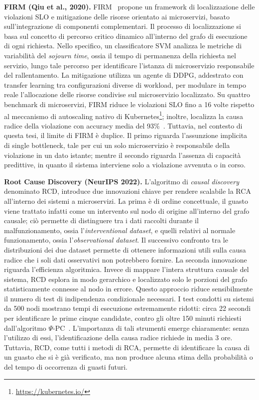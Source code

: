 \textbf{FIRM (Qiu et al., 2020).} FIRM~\cite{qiu2020firm} propone un framework di 
localizzazione delle violazioni \gls{SLO} e mitigazione delle risorse orientato ai 
microservizi, basato sull'integrazione di componenti complementari. 
Il processo di localizzazione si basa sul concetto di percorso critico dinamico all'interno 
del grafo di esecuzione di ogni richiesta. Nello specifico, un classificatore \gls{SVM} analizza le 
metriche di variabilità del \emph{sojourn time}, ossia il tempo di permanenza della richiesta nel servizio, 
lungo tale percorso per identificare l'istanza di microservizio responsabile del rallentamento. 
La mitigazione utilizza un agente di \gls{DDPG}, addestrato con transfer learning tra configurazioni 
diverse di workload, per modulare in tempo reale l'allocazione delle risorse condivise 
sul microservizio localizzato. Su quattro benchmark di microservizi, FIRM riduce le violazioni 
\gls{SLO} fino a 16 volte rispetto al meccanismo di autoscaling nativo di Kubernetes\footnote{\url{https://kubernetes.io/}}; 
inoltre, localizza la causa radice della violazione con accuracy media del 93\%~\cite{qiu2020firm}. 
Tuttavia, nel contesto di questa tesi, il limite di FIRM è duplice. Il primo riguarda 
l'assunzione implicita di single bottleneck, tale per cui un solo microservizio è 
responsabile della violazione in un dato istante; mentre il secondo riguarda l'assenza 
di capacità predittive, in quanto il sistema interviene solo a violazione avvenuta o in corso.

\textbf{Root Cause Discovery (NeurIPS 2022).} L'algoritmo di \emph{causal discovery}~\cite{ikram2022rcd} denominato \gls{RCD}, 
introduce due innovazioni chiave per rendere scalabile la \gls{RCA} all'interno dei sistemi a microservizi. 
La prima è di ordine concettuale, il guasto viene trattato infatti come un intervento sul nodo di origine 
all'interno del grafo causale; ciò permette di distinguere tra i dati raccolti durante 
il malfunzionamento, ossia l'\emph{interventional dataset}, e quelli relativi al normale funzionamento, 
ossia l'\emph{observational dataset}. Il successivo confronto tra le distribuzioni dei due dataset permette 
di ottenere informazioni utili sulla causa radice che i soli dati osservativi non potrebbero fornire. 
La seconda innovazione riguarda l'efficienza algoritmica. Invece di mappare 
l'intera struttura causale del sistema, \gls{RCD} esplora in modo gerarchico e localizzato solo le porzioni 
del grafo statisticamente connesse al nodo in errore. Questo approccio riduce sensibilmente il numero 
di test di indipendenza condizionale necessari. I test condotti su sistemi da 500 nodi mostrano tempi 
di esecuzione estremamente ridotti: circa 22 secondi per identificare le prime cinque candidate, 
contro gli oltre 150 minuti richiesti dall'algoritmo $\Psi$-PC~\cite{ikram2022rcd}. L'importanza di tali strumenti emerge chiaramente: 
senza l'utilizzo di essi, l'identificazione della causa radice richiede in media 3 ore. 
Tuttavia, \gls{RCD}, come tutti i metodi di \gls{RCA}, permette di identificare la causa di un guasto che si è già verificato, 
ma non produce alcuna stima della probabilità o del tempo di occorrenza di guasti futuri.

